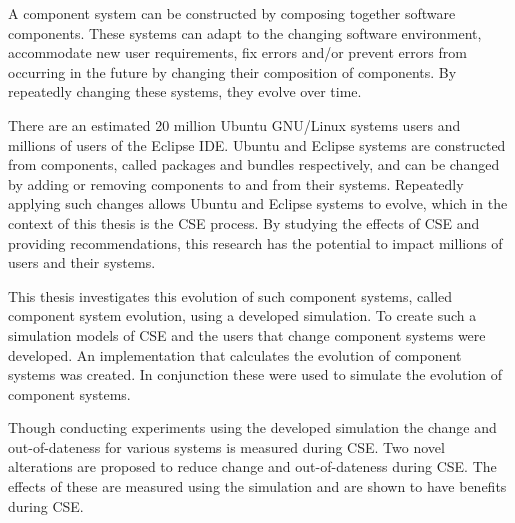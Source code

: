 A component system can be constructed by composing together software components.
These systems can adapt to the changing software environment, accommodate new user requirements, 
fix errors and/or prevent errors from occurring in the future by changing their composition of components.
By repeatedly changing these systems, they evolve over time.

There are an estimated 20 million Ubuntu GNU/Linux systems users and millions of users of the Eclipse IDE.
Ubuntu and Eclipse systems are constructed from components, called packages and bundles respectively, 
and can be changed by adding or removing components to and from their systems. 
Repeatedly applying such changes allows Ubuntu and Eclipse systems to evolve, which in the context of this thesis is the CSE process.
By studying the effects of CSE and providing recommendations, this research has the potential to impact millions of users and their systems.

This thesis investigates this evolution of such component systems, called component system evolution, using a developed simulation.
To create such a simulation models of CSE and the users that change component systems were developed.
An implementation that calculates the evolution of component systems was created.
In conjunction these were used to simulate the evolution of component systems.

Though conducting experiments using the developed simulation the change and out-of-dateness for various systems is measured during CSE. 
Two novel alterations are proposed to reduce change and out-of-dateness during CSE.
The effects of these are measured using the simulation and are shown to have benefits during CSE.
